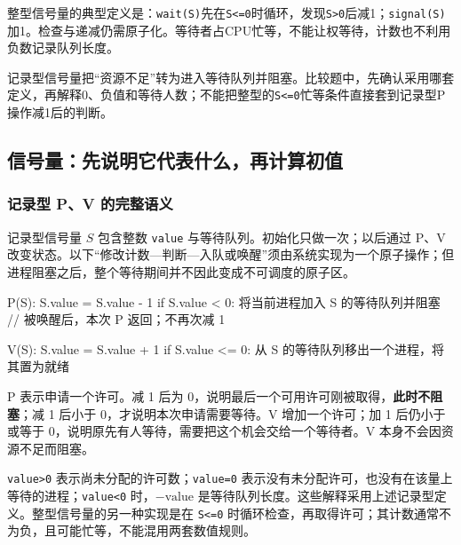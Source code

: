 整型信号量的典型定义是：\texttt{wait(\allowbreak{}S)\allowbreak{}}先在\texttt{S<\allowbreak{}=\allowbreak{}0}时循环，发现\texttt{S>\allowbreak{}0}后减1；\texttt{signal(\allowbreak{}S)\allowbreak{}}加1。检查与递减仍需原子化。等待者占CPU忙等，不能让权等待，计数也不利用负数记录队列长度。

记录型信号量把``资源不足''转为进入等待队列并阻塞。比较题中，先确认采用哪套定义，再解释0、负值和等待人数；不能把整型的\texttt{S<\allowbreak{}=\allowbreak{}0}忙等条件直接套到记录型P操作减1后的判断。

\subsection{信号量：先说明它代表什么，再计算初值}\label{OS02-semaphore}

\subsubsection{记录型 P、V 的完整语义}\label{OS02-auto-12}

记录型信号量 \(S\) 包含整数 \texttt{value} 与等待队列。初始化只做一次；以后通过 P、V 改变状态。以下``修改计数---判断---入队或唤醒''须由系统实现为一个原子操作；但进程阻塞之后，整个等待期间并不因此变成不可调度的原子区。

\par\medskip\noindent\begin{minipage}{\linewidth}
\begin{codeblock}[language={}]
P(S):
    S.value = S.value - 1
    if S.value < 0:
        将当前进程加入 S 的等待队列并阻塞
        // 被唤醒后，本次 P 返回；不再次减 1

V(S):
    S.value = S.value + 1
    if S.value <= 0:
        从 S 的等待队列移出一个进程，将其置为就绪
\end{codeblock}
\end{minipage}\par\medskip

P 表示申请一个许可。减 1 后为 0，说明最后一个可用许可刚被取得，\textbf{此时不阻塞}；减 1 后小于 0，才说明本次申请需要等待。V 增加一个许可；加 1 后仍小于或等于 0，说明原先有人等待，需要把这个机会交给一个等待者。V 本身不会因资源不足而阻塞。

\texttt{value>\allowbreak{}0} 表示尚未分配的许可数；\texttt{value=\allowbreak{}0} 表示没有未分配许可，也没有在该量上等待的进程；\texttt{value<\allowbreak{}0} 时，\(-\mathrm{value}\) 是等待队列长度。这些解释采用上述记录型定义。整型信号量的另一种实现是在 \texttt{S<\allowbreak{}=\allowbreak{}0} 时循环检查，再取得许可；其计数通常不为负，且可能忙等，不能混用两套数值规则。

